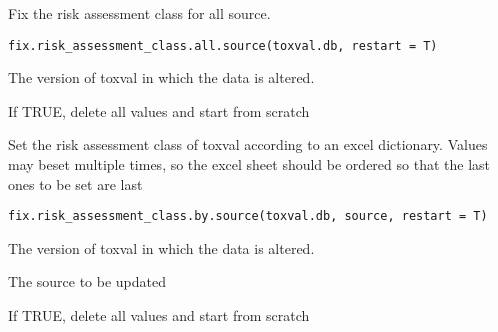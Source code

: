 \documentclass[letterpaper]{book}
\begin{document}
%
\begin{Description}\relax
Fix the risk assessment class for all source.
\end{Description}
%
\begin{Usage}
\begin{verbatim}
fix.risk_assessment_class.all.source(toxval.db, restart = T)
\end{verbatim}
\end{Usage}
%
\begin{Arguments}
\begin{ldescription}
\item[\code{toxval.db}] The version of toxval in which the data is altered.

\item[\code{restart}] If TRUE, delete all values and start from scratch
\end{ldescription}
\end{Arguments}
%
\begin{Description}\relax
Set the risk assessment class of toxval according to an excel dictionary.
Values may beset multiple times, so the excel sheet should be ordered so that
the last ones to be set are last
\end{Description}
%
\begin{Usage}
\begin{verbatim}
fix.risk_assessment_class.by.source(toxval.db, source, restart = T)
\end{verbatim}
\end{Usage}
%
\begin{Arguments}
\begin{ldescription}
\item[\code{toxval.db}] The version of toxval in which the data is altered.

\item[\code{source}] The source to be updated

\item[\code{restart}] If TRUE, delete all values and start from scratch
\end{ldescription}
\end{Arguments}
\end{document}
